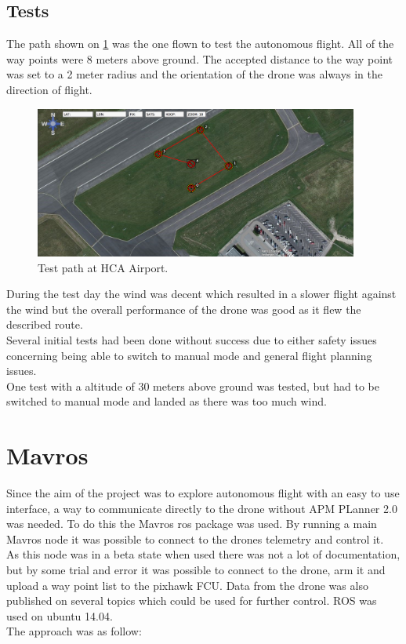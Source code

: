  
\subsection{Tests}
The path shown on \ref{fig:HCAPath} was the one flown to test the autonomous flight. All of the way points were 8 meters above ground. The accepted distance to the way point was set to a 2 meter radius and the orientation of the drone was always in the direction of flight. 

\begin{figure}[H]
  \centering
    \includegraphics[width=0.95\textwidth]{./Images/HCAPath}
  \caption{Test path at HCA Airport.}
  \label{fig:HCAPath}
\end{figure}

During the test day the wind was decent which resulted in a slower flight against the wind but the overall performance of the drone was good as it flew the described route. \\

Several initial tests had been done without success due to either safety issues concerning being able to switch to manual mode and general flight planning issues.\\

One test with a altitude of 30 meters above ground was tested, but had to be switched to manual mode and landed as there was too much wind.\\
 
\section{Mavros}
Since the aim of the project was to explore autonomous flight with an easy to use interface, a way to communicate directly to the drone without APM PLanner 2.0 was needed. To do this the Mavros \cite{Ref:Mavros} ros package was used. By running a main Mavros node it was possible to connect to the drones telemetry and control it.\\
As this node was in a beta state when used there was not a lot of documentation, but by some trial and error it was possible to connect to the drone, arm it and upload a way point list to the pixhawk FCU. Data from the drone was also published on several topics which could be used for further control. ROS was used on ubuntu 14.04.\\
The approach was as follow:

